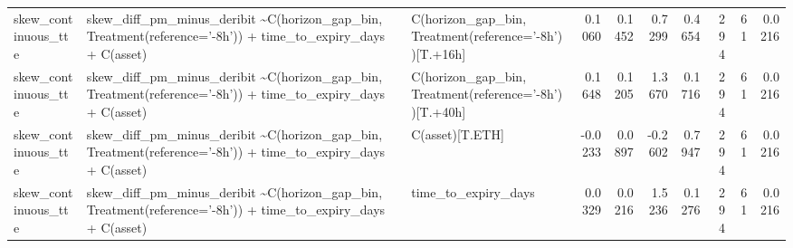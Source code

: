 \begin{table}
\begin{tabular}{lllrrrrrrr}
skew\_continuous\_tte & skew\_diff\_pm\_minus\_deribit \textasciitilde \space C(horizon\_gap\_bin, Treatment(reference='-8h')) + time\_to\_expiry\_days + C(asset) & C(horizon\_gap\_bin, Treatment(reference='-8h'))[T.+16h] & 0.1060 & 0.1452 & 0.7299 & 0.4654 & 294 & 61 & 0.0216 \\
skew\_continuous\_tte & skew\_diff\_pm\_minus\_deribit \textasciitilde \space C(horizon\_gap\_bin, Treatment(reference='-8h')) + time\_to\_expiry\_days + C(asset) & C(horizon\_gap\_bin, Treatment(reference='-8h'))[T.+40h] & 0.1648 & 0.1205 & 1.3670 & 0.1716 & 294 & 61 & 0.0216 \\
skew\_continuous\_tte & skew\_diff\_pm\_minus\_deribit \textasciitilde \space C(horizon\_gap\_bin, Treatment(reference='-8h')) + time\_to\_expiry\_days + C(asset) & C(asset)[T.ETH] & -0.0233 & 0.0897 & -0.2602 & 0.7947 & 294 & 61 & 0.0216 \\
skew\_continuous\_tte & skew\_diff\_pm\_minus\_deribit \textasciitilde \space C(horizon\_gap\_bin, Treatment(reference='-8h')) + time\_to\_expiry\_days + C(asset) & time\_to\_expiry\_days & 0.0329 & 0.0216 & 1.5236 & 0.1276 & 294 & 61 & 0.0216 \\
\bottomrule
\end{tabular}
\end{table}
